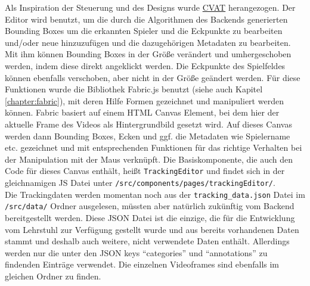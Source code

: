 Als Inspiration der Steuerung und des Designs wurde \href{www.cvat.ai}{CVAT} \cite{cvat} herangezogen. Der Editor wird benutzt, um die durch die Algorithmen des Backends generierten Bounding Boxes um die erkannten Spieler und die Eckpunkte zu bearbeiten und/oder neue hinzuzufügen und die dazugehörigen Metadaten zu bearbeiten. Mit ihm können Bounding Boxes in der Größe verändert und umhergeschoben werden, indem diese direkt angeklickt werden. Die Eckpunkte des Spielfeldes können ebenfalls verschoben, aber nicht in der Größe geändert werden. Für diese Funktionen wurde die Bibliothek Fabric.js benutzt (siehe auch Kapitel \ref{chapter:fabric}), mit deren Hilfe Formen gezeichnet und manipuliert werden können. Fabric basiert auf einem HTML Canvas Element, bei dem hier der aktuelle Frame des Videos als Hintergrundbild gesetzt wird. Auf dieses Canvas werden dann Bounding Boxes, Ecken und ggf. die Metadaten wie Spielername etc. gezeichnet und mit entsprechenden Funktionen für das richtige Verhalten bei der Manipulation mit der Maus verknüpft. Die Basiskomponente, die auch den Code für dieses Canvas enthält, heißt \texttt{TrackingEditor} und findet sich in der gleichnamigen JS Datei unter \texttt{/src/components/pages/trackingEditor/}.\\

Die Trackingdaten werden momentan noch aus der \texttt{tracking\_data.json} Datei im \texttt{/src/data/} Ordner ausgelesen, müssten aber natürlich zukünftig vom Backend bereitgestellt werden. Diese JSON Datei ist die einzige, die für die Entwicklung vom Lehrstuhl zur Verfügung gestellt wurde und aus bereits vorhandenen Daten stammt und deshalb auch weitere, nicht verwendete Daten enthält. Allerdings werden nur die unter den JSON keys ``categories'' und ``annotations'' zu findenden Einträge verwendet. Die einzelnen Videoframes sind ebenfalls im gleichen Ordner zu finden.\\

